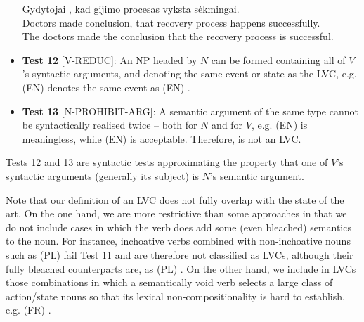 \documentclass[output=paper,
modfonts,
]{langscibook}
\begin{document}
\begin{itemize}
\ea \label{lt:make-conclusion}
\settowidth {}
\gll Gydytojai  , kad gijimo procesas vyksta sėkmingai. \\
Doctors made conclusion, that recovery process happens successfully.\\ 
\glt The doctors made the conclusion that the recovery process is successful. 
\z


\item[] \textbf{Test 12} [V-REDUC]: An NP headed by $N$ can be formed containing all of $V$'s syntactic arguments, and denoting the same event or state as the LVC, e.g. (EN)  denotes the same event as (EN) . 

\item[] \textbf{Test 13} [N-PROHIBIT-ARG]: A semantic argument of the same type cannot be syntactically realised twice -- both for $N$ and for $V$, e.g. (EN)  is meaningless, while (EN)  is acceptable. Therefore,  is not an LVC. %
    
\end{itemize}

Tests 12 and 13 are syntactic tests approximating the property that one of $V$'s syntactic arguments (generally its subject) is $N$'s semantic argument.

Note that our definition of an LVC does not fully overlap with the state of the art. On the one hand, we are more restrictive than some approaches in that we do not include cases in which the verb does add some (even bleached) semantics to the noun. For instance, inchoative verbs combined with non-inchoative nouns such as (PL)  fail Test 11 and are therefore not classified as LVCs, although their fully bleached counterparts are, as (PL) . On the other hand, we include in LVCs those combinations in which a semantically void verb selects a large class of action/state nouns so that its lexical non-com\-po\-si\-tio\-na\-li\-ty is hard to establish, e.g. (FR)  .
\end{document}

